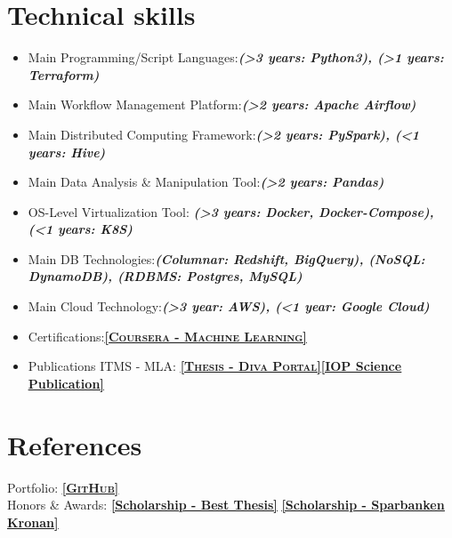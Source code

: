 \documentclass[11pt,a4paper,sans,colorlinks,linkcolor=blue,urlcolor=blue]{moderncv}
\begin{document}

\section{Technical skills}
\begin{itemize}
    \item Main Programming/Script Languages:\textbf{\textit{(>3 years: Python3), (>1 years: Terraform)}}
    \item Main Workflow Management Platform:\textbf{\textit{(>2 years: Apache Airflow)}}
    \item Main Distributed Computing Framework:\textbf{\textit{(>2 years: PySpark), (<1 years: Hive)}}
    \item Main Data Analysis \& Manipulation Tool:\textbf{\textit{(>2 years: Pandas)}}
    \item OS-Level Virtualization Tool: \textbf{\textit{(>3 years: Docker, Docker-Compose), (<1 years: K8S)}}
    \item Main DB Technologies:\textbf{\textit{(Columnar: Redshift, BigQuery), (NoSQL: DynamoDB), (RDBMS: Postgres, MySQL)}}
    \item Main Cloud Technology:\textbf{\textit{(>3 year: AWS), (<1 year: Google Cloud)}}
    \item Certifications:\href{https://www.coursera.org/account/accomplishments/certificate/W5HM63ABYCDV}{\textbf{\textsc{\underline{[Coursera - Machine Learning]}}}}
    \item Publications ITMS - MLA\footnotemark[2]: \href{http://hh.diva-portal.org/smash/record.jsf?pid=diva2%3A1113511&dswid=4291#sthash.wwKv4JYI.dpbs}{\textbf{\textsc{\underline{[Thesis - Diva Portal]}}}}\href{http://iopscience.iop.org/article/10.1088/1757-899X/252/1/012018/pdf;jsessionid=EF9A9E415EC41D639019919DC566B21F.c4.iopscience.cld.iop.org}{\textbf{\underline{[IOP Science Publication]}}}
\end{itemize}
\section{References}
Portfolio: \underline{\href{https://github.com/Thelin90}{\textbf{\textsc{[GitHub]}}}}\\
Honors \& Awards: \href{https://www.hms-networks.com/work/in/sweden/hms-scholarship}{\textbf{\underline{[Scholarship - Best Thesis]}}} \href{http://www.hh.se/omhogskolan/aktuellt/nyheter/nyheter/studenterbelonasavsparbanksstiftelsenkronan.65446700.html}{\textbf{\underline{[Scholarship - Sparbanken Kronan]}}}

     
     
\vfill
\enlargethispage{\footskip}
\end{document}
